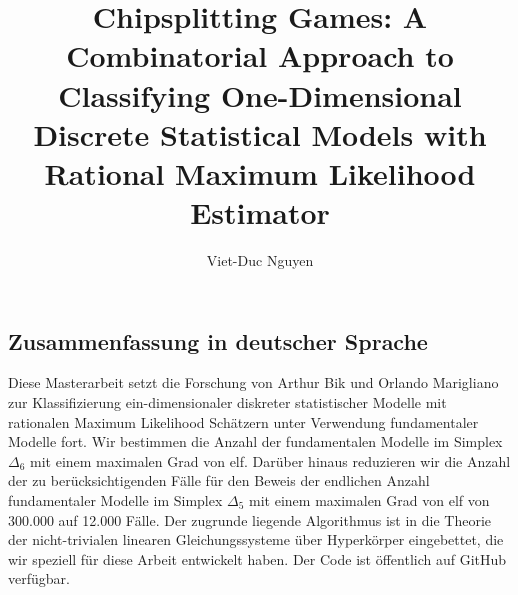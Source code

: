 \documentclass[masters]{ucbthesis}
\theoremstyle{definition}
\begin{document}

\title{Chipsplitting Games: A Combinatorial Approach to Classifying One-Dimensional Discrete Statistical Models with Rational Maximum Likelihood Estimator}
\author{Viet-Duc Nguyen}


\maketitle
\copyrightpage

\begin{alwayssingle}
\section*{Zusammenfassung in deutscher Sprache}

Diese Masterarbeit setzt die Forschung von Arthur Bik und Orlando Marigliano zur Klassifizierung ein-dimensionaler diskreter statistischer Modelle mit rationalen Maximum Likelihood Schätzern unter Verwendung fundamentaler Modelle fort. Wir bestimmen die Anzahl der fundamentalen Modelle im Simplex \( \Delta_6 \) mit einem maximalen Grad von elf. Darüber hinaus reduzieren wir die Anzahl der zu berücksichtigenden Fälle für den Beweis der endlichen Anzahl fundamentaler Modelle im Simplex \( \Delta_5 \) mit einem maximalen Grad von elf von 300.000 auf 12.000 Fälle. Der zugrunde liegende Algorithmus ist in die Theorie der nicht-trivialen linearen Gleichungssysteme über Hyperkörper eingebettet, die wir speziell für diese Arbeit entwickelt haben. Der Code ist öffentlich auf GitHub verfügbar.

\end{alwayssingle}
\end{document}
